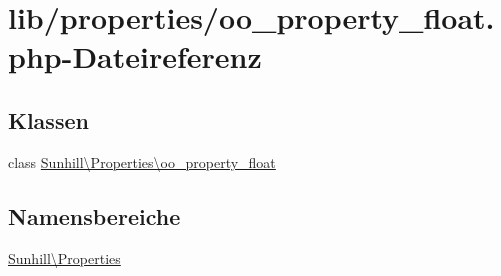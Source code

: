 \hypertarget{oo__property__float_8php}{}\section{lib/properties/oo\+\_\+property\+\_\+float.php-\/\+Dateireferenz}
\label{oo__property__float_8php}
\subsection*{Klassen}
\begin{DoxyCompactItemize}
\item 
class \hyperlink{classSunhill_1_1Properties_1_1oo__property__float}{Sunhill\textbackslash{}\+Properties\textbackslash{}oo\+\_\+property\+\_\+float}
\end{DoxyCompactItemize}
\subsection*{Namensbereiche}
\begin{DoxyCompactItemize}
\item 
 \hyperlink{namespaceSunhill_1_1Properties}{Sunhill\textbackslash{}\+Properties}
\end{DoxyCompactItemize}

